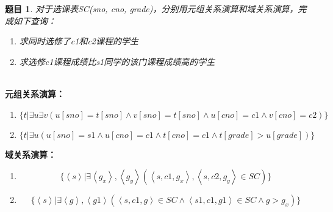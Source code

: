 \documentclass[12pt]{article} %
\theoremstyle{problemstyle} %
\newtheorem{problem}{题目} %
\newenvironment{solution}
  {%
    \renewcommand\qedsymbol{$\blacksquare$}%
    \proof[\textit{解答}]\mbox{}\vspace{-4ex}\\%
  }
  {\endproof}
\begin{document}
\begin{problem}
对于选课表SC(sno, cno, grade)，分别用元组关系演算和域关系演算，完成如下查询：

\begin{enumerate}
  \item 求同时选修了c1和c2课程的学生
  \item 求选修c1课程成绩比s1同学的该门课程成绩高的学生
\end{enumerate}  
  
\end{problem}

\begin{solution}

\textbf{元组关系演算：}

\begin{enumerate}
  \item 
  \[
    \{t|\exists u\exists v(u[sno]=t[sno]\wedge v[sno]=t[sno]\wedge u[cno]=c1\wedge v[cno]=c2)\}
  \]
  \item 
  \[
    \{t|\exists u(u[sno]=s1\wedge u[cno]=c1\wedge t[cno]=c1\wedge t[grade]>u[grade])\}
  \]
\end{enumerate}

\textbf{域关系演算：}

\begin{enumerate}
  \item 
  \[
    \{\left< s\right> |\exists\left< g_x\right> ,\left< g_y\right> (\left< s,c1,g_x\right> ,\left< s,c2,g_y\right> \in SC)\}
  \]
  \item 
  \[
    \{\left< s\right> |\exists\left< g\right>, \left< g1\right> (\left< s,c1,g\right> \in SC\wedge \left< s1,c1,g1\right> \in SC\wedge g> g_x)\}
  \]
\end{enumerate}

\end{solution}

\newpage


\end{document}
